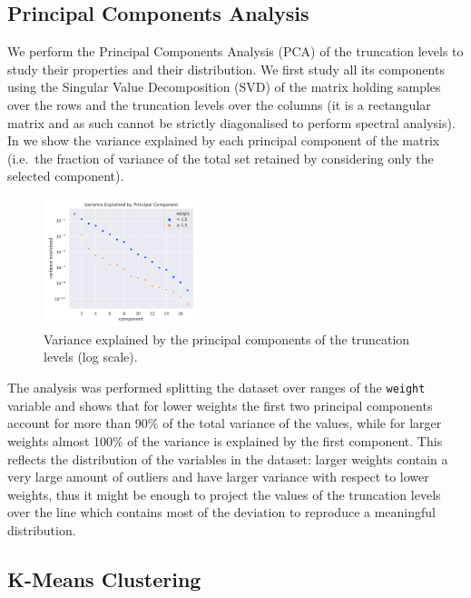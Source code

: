\subsection{Principal Components Analysis}\label{sec:eda:pca}

We perform the Principal Components Analysis (PCA) of the truncation levels to
study their properties and their distribution.
We first study all its components using the Singular Value Decomposition (SVD)
of the matrix holding samples over the rows and the truncation levels over the
columns (it is a rectangular matrix and as such cannot be strictly diagonalised
to perform spectral analysis).
In  we show the variance explained by each principal
component of the matrix (i.e.\ the fraction of variance of the total set
retained by considering only the selected component).
\begin{figure}[htbp]
  \centering
  \includegraphics[width=0.4\textwidth]{img/pca-variance-explained}
  \caption{Variance explained by the principal components of the truncation levels (log scale).}
  \label{fig:eda:pca}
\end{figure}

The analysis was performed splitting the dataset over ranges of the
\texttt{weight} variable and shows that for lower weights the first two
principal components account for more than 90\% of the total variance of the
values, while for larger weights almost 100\% of the variance is explained by
the first component.
This reflects the distribution of the variables in the dataset: larger weights
contain a very large amount of outliers and have larger variance with respect
to lower weights, thus it might be enough to project the values of the
truncation levels over the line which contains most of the deviation to
reproduce a meaningful distribution.

\subsection{K-Means Clustering}\label{sec:eda:kmeans}

